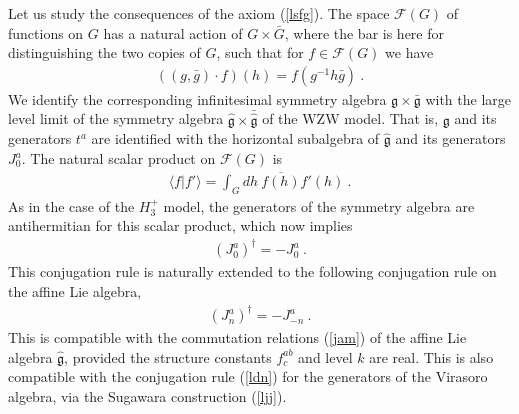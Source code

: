 \documentclass[12pt,a4paper,notitlepage]{report}
\numberwithin{equation}{section}
\theoremstyle{break}
\begin{document}
Let us study the consequences of the axiom (\ref{lsfg}). The space $\mathcal{F}(G)$ of functions on $G$ has a natural action of 
$G\times \bar{G}$, where the bar is here for distinguishing the two copies of $G$, such that for $f\in \mathcal{F}(G)$ we have 
\begin{align}
\left( (g,\bar{g})\cdot f\right)(h) = f(g^{-1}h\bar{g})\ .
\end{align}
We identify the corresponding infinitesimal symmetry algebra $\mathfrak{g}\times \bar{\mathfrak{g}}$ with the large level limit of the symmetry algebra $\hat{\mathfrak{g}}\times \bar{\hat{\mathfrak{g}}}$ of the WZW model. That is, $\mathfrak{g}$ and its generators $t^a$ are identified with the horizontal subalgebra of $\hat{\mathfrak{g}}$ and its generators $J^a_0$. The natural scalar product on $\mathcal{F}(G)$ is 
\begin{align}
 \langle f|f'\rangle = \int_G dh\ \overline{f(h)} f'(h)\ .
\label{gbg}
\end{align}
As in the case of the $H_3^+$ model, the generators of the symmetry algebra are antihermitian for this scalar product, which now implies
\begin{align}
 (J^a_0)^\dagger = -J^a_0\  . 
\label{jzdj}
\end{align}
This conjugation rule is naturally extended to the following conjugation rule on the affine Lie algebra,
\begin{align}
 \boxed{(J^a_n)^\dagger = -J^a_{-n}}\ .
\end{align}
This is compatible with the commutation relations (\ref{jam}) of the affine Lie algebra $\hat{\mathfrak{g}}$, provided the structure constants $f^{ab}_c$ and level $k$ are real. This is also compatible with the conjugation rule (\ref{ldn}) for the generators of the Virasoro algebra, via the Sugawara construction (\ref{ljj}).
\end{document}
